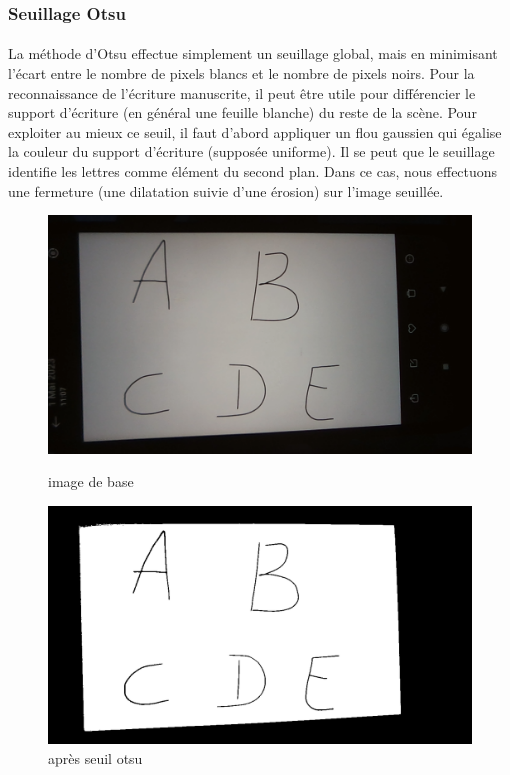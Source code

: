 \documentclass[a4paper]{article}
\begin{document}
				\subsubsection{Seuillage Otsu}
				\paragraph{} La méthode d'Otsu effectue simplement un seuillage global, mais en minimisant l'écart entre le nombre de pixels blancs et le nombre de pixels noirs. Pour la reconnaissance de l'écriture manuscrite, il peut être utile pour différencier le support d'écriture (en général une feuille blanche) du reste de la scène.
				Pour exploiter au mieux ce seuil, il faut d'abord appliquer un flou gaussien qui égalise la couleur du support d'écriture (supposée uniforme). 
				Il se peut que le seuillage identifie les lettres comme élément du second plan. Dans ce cas, nous effectuons une fermeture (une dilatation suivie d'une érosion) sur l'image seuillée.
				

				\begin{figure}[h]
					\centering
					\begin{minipage}{.5\textwidth}
					  \centering
					  \includegraphics[width=.8\linewidth]{sansOtsu.png}
					  \caption{image de base}
					  \label{fig:sansOtsu}
					\end{minipage}%
					\begin{minipage}{.5\textwidth}
					  \centering
					  \includegraphics[width=.8\linewidth]{apresOtsu.png}
					  \caption{après seuil otsu}
					  \label{fig:apresOtsu}
					\end{minipage}
				\end{figure}
\end{document}
